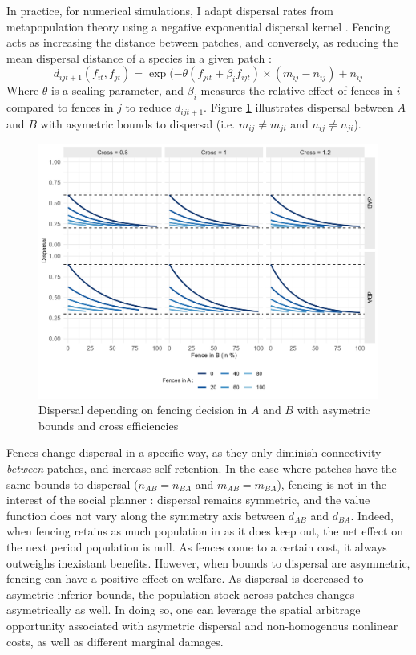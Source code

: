 In practice, for numerical simulations, I adapt dispersal rates from metapopulation theory using a negative exponential dispersal kernel \citep{hanski_estimating_2000, MOILANEN2004533}. Fencing acts as increasing the distance between patches, and conversely, as reducing the mean dispersal distance of a species in a given patch : 
\begin{equation}
d_{ijt+1}(f_{it},f_{jt}) = \exp(-\theta( f_{jit} + \beta_i f_{ijt})\times (m_{ij} - n_{ij}) + n_{ij}
\end{equation}
Where $\theta$ is a scaling parameter, and $\beta_i$ measures the relative effect of fences in $i$ compared to fences in $j$ to reduce $d_{ijt+1}$. Figure \ref{fig:dispersal_illustration} illustrates dispersal between $A$ and $B$ with asymetric bounds to dispersal (i.e. $m_{ij} \neq m_{ji}$ and $n_{ij} \neq n_{ji}$). 

\begin{figure}[H]
	\centering
	\includegraphics[width=.6\textwidth]{figures/fences/illustration_dispersal.jpg}
	\caption{Dispersal depending on fencing decision in $A$ and $B$ with asymetric bounds and cross efficiencies}
	\label{fig:dispersal_illustration}
\end{figure}

Fences change dispersal in a specific way, as they only diminish connectivity \textit{between} patches, and increase self retention. In the case where patches have the same bounds to dispersal ($n_{AB} = n_{BA}$ and $m_{AB} = m_{BA}$), fencing is not in the interest of the social planner : 
dispersal remains symmetric, and the value function does not vary along the symmetry axis between $d_{AB}$ and $d_{BA}$. Indeed, when fencing retains as much population in as it does keep out, the net effect on the next period population is null. As fences come to a certain cost, it always outweighs inexistant benefits. However, when bounds to dispersal are asymmetric, fencing can have a positive effect on welfare. As dispersal is decreased to asymetric inferior bounds, the population stock across patches changes asymetrically as well. In doing so, one can leverage the spatial arbitrage opportunity associated with asymetric dispersal and non-homogenous nonlinear costs, as well as different marginal damages. 


